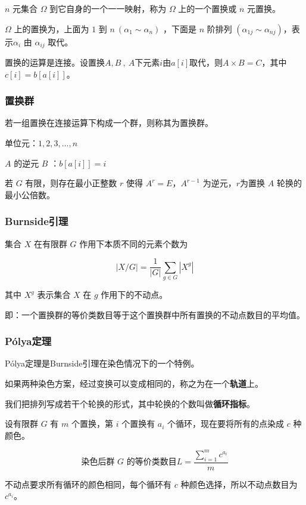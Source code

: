     $n$ 元集合 $\Omega$ 到它自身的一个一一映射，称为 $\Omega$ 上的一个置换或 $n$ 元置换。

    $\Omega$ 上的置换为，上面为 $1$ 到 $n\ (\alpha_{1}\sim \alpha_{n})$ ，下面是 $n$ 阶排列 $(\alpha_{1j}\sim \alpha_{nj})$，表示$\alpha_{i}$ 由 $\alpha_{ij}$ 取代。

    置换的运算是连接。设置换$A,B\ ,\ A$下元素$i$由$a[i]$取代，则$A×B=C$，其中$c[i]=b[a[i]]$。

    \subsubsection*{置换群}

    若一组置换在连接运算下构成一个群，则称其为置换群。

    单位元：${1,2,3,…,n}$

    $A$ 的逆元 $B$ ：$b[a[i]]=i$

    若 $G$ 有限，则存在最小正整数 $r$ 使得 $A^r=E$，$A^{r-1}$ 为逆元，$r$为置换 $A$ 轮换的最小公倍数。


    \subsubsection*{Burnside引理}

    集合 $X$ 在有限群 $G$ 作用下本质不同的元素个数为

    $$
    |X/G|=\frac{1}{|G|}\sum_{g\in G}|X^g|
    $$

    其中 $X^g$ 表示集合 $X$ 在 $g$ 作用下的不动点。

    即：一个置换群的等价类数目等于这个置换群中所有置换的不动点数目的平均值。


    \subsubsection*{Pólya定理}

    Pólya定理是Burnside引理在染色情况下的一个特例。

    如果两种染色方案，经过变换可以变成相同的，称之为在一个\textbf{轨道}上。

    我们把排列写成若干个轮换的形式，其中轮换的个数叫做\textbf{循环指标}。

    设有限群 $G$ 有 $m$ 个置换，第 $i$ 个置换有 $a_i$ 个循环，现在要将所有的点染成 $c$ 种颜色。

    $$
    \text{染色后群 $G$ 的等价类数目} L=\frac{\sum_{i=1}^m c^{a_i}}m
    $$

    不动点要求所有循环的颜色相同，每个循环有 $c$ 种颜色选择，所以不动点数目为 $c^{a_i}$。

